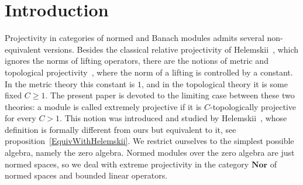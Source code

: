 \documentclass[12pt]{article}
\newcommand{\Nor}{\mathbf{Nor}}
\begin{document}
\bigskip


\section{Introduction}\label{SectionIntroduction}

Projectivity in categories of normed and Banach modules admits several
non-equivalent versions. Besides the classical relative projectivity of
Helemskii~\cite{HelHomolBanTopAlg}, which ignores the norms of lifting
operators, there are the notions of metric and topological
projectivity~\cite{HelMetrFrQMod, WhiteInjmoduAlg}, where the
norm of a lifting is controlled by a constant. In the metric theory this
constant is $1$, and in the topological theory it is some fixed $C\geq 1$. The
present paper is devoted to the limiting case between these two theories: a
module is called extremely projective if it is $C$-topologically projective for
every $C>1$. This notion was introduced and studied by
Helemskii~\cite{HelExtrProjSeqAlg, HelMetrFrQMod}, whose definition is
formally different from ours but equivalent to it, see
proposition~\ref{EquivWithHelemskii}. We restrict
ourselves to the simplest possible algebra, namely the zero algebra. Normed
modules over the zero algebra are just normed spaces, so we deal with extreme
projectivity in the category $\Nor$ of normed spaces and bounded linear
operators.
\end{document}
